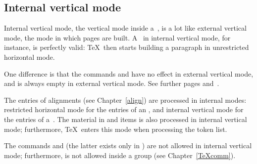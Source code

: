 \documentclass[twoside,letterpaper,openright]{rapport3}
\begin{document}
\subsection{Internal vertical mode}

Internal vertical mode, the vertical mode inside
a~, is a lot like external vertical
mode, the mode in which pages are built.
A~ in internal vertical mode,
for instance, is perfectly valid:
\TeX\ then starts building a paragraph in
unrestricted horizontal mode.

One difference is that the commands
 and  have no effect
in external vertical mode, and
 is always empty in external vertical mode.
See further pages \pageref{lastbox} and~\pageref{unskip}.

The entries of alignments (see Chapter~\ref{align}) are 
processed in internal modes: restricted horizontal mode
for the entries of an , and internal vertical
mode for the entries of a~.
The material in    and  items
is also processed in internal vertical mode; furthermore,
\TeX\ enters this mode when processing the  token list.

The commands  and  (the latter exists only in \IniTeX)
are not allowed in
internal vertical mode; furthermore,  is not allowed
inside a group (see Chapter~\ref{TeXcomm}).
\end{document}
